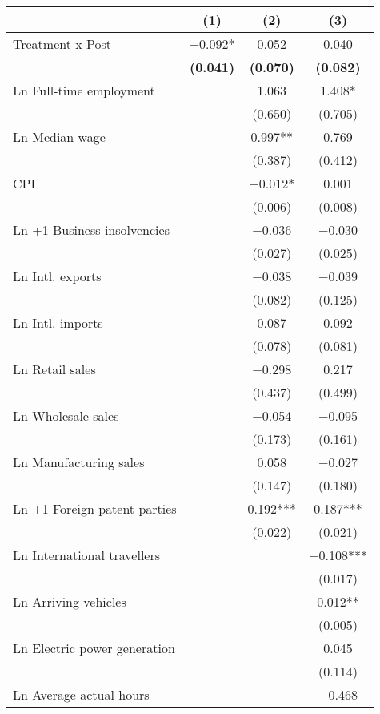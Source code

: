 
\begin{tabular}[t]{lccc}
\toprule
  & (1) & (2) & (3)\\
\midrule
Treatment x Post & \num{-0.092}* & \num{0.052} & \num{0.040}\\
\textbf{} & \textbf{(\num{0.041})} & \textbf{(\num{0.070})} & \textbf{(\num{0.082})}\\
Ln Full-time employment &  & \num{1.063} & \num{1.408}*\\
 &  & (\num{0.650}) & (\num{0.705})\\
Ln Median wage &  & \num{0.997}** & \num{0.769}\\
 &  & (\num{0.387}) & (\num{0.412})\\
CPI &  & \num{-0.012}* & \num{0.001}\\
 &  & (\num{0.006}) & (\num{0.008})\\
Ln +1 Business insolvencies &  & \num{-0.036} & \num{-0.030}\\
 &  & (\num{0.027}) & (\num{0.025})\\
Ln Intl. exports &  & \num{-0.038} & \num{-0.039}\\
 &  & (\num{0.082}) & (\num{0.125})\\
Ln Intl. imports &  & \num{0.087} & \num{0.092}\\
 &  & (\num{0.078}) & (\num{0.081})\\
Ln Retail sales &  & \num{-0.298} & \num{0.217}\\
 &  & (\num{0.437}) & (\num{0.499})\\
Ln Wholesale sales &  & \num{-0.054} & \num{-0.095}\\
 &  & (\num{0.173}) & (\num{0.161})\\
Ln Manufacturing sales &  & \num{0.058} & \num{-0.027}\\
 &  & (\num{0.147}) & (\num{0.180})\\
Ln +1 Foreign patent parties &  & \num{0.192}*** & \num{0.187}***\\
 &  & (\num{0.022}) & (\num{0.021})\\
Ln International travellers &  &  & \num{-0.108}***\\
 &  &  & (\num{0.017})\\
Ln Arriving vehicles &  &  & \num{0.012}**\\
 &  &  & (\num{0.005})\\
Ln Electric power generation &  &  & \num{0.045}\\
 &  &  & (\num{0.114})\\
Ln Average actual hours &  &  & \num{-0.468}\\

\end{tabular}
